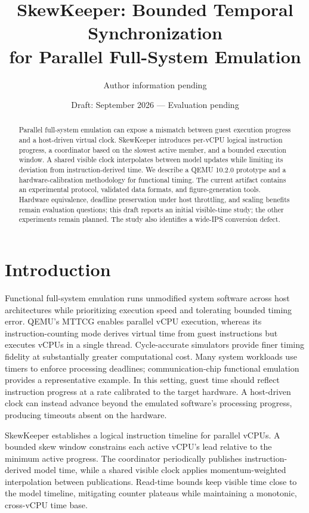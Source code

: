 \documentclass[10pt]{article}
\title{SkewKeeper: Bounded Temporal Synchronization\\for Parallel Full-System Emulation}
\author{Author information pending}
\date{Draft: September 2026 --- Evaluation pending}
\begin{document}
\maketitle
\begin{abstract}
Parallel full-system emulation can expose a mismatch between guest execution
progress and a host-driven virtual clock. SkewKeeper introduces per-vCPU logical
instruction progress, a coordinator based on the slowest active member, and a
bounded execution window. A shared visible clock interpolates between model
updates while limiting its deviation from instruction-derived time. We describe
a QEMU 10.2.0 prototype and a hardware-calibration methodology for functional
timing. The current artifact contains an experimental protocol, validated data
formats, and figure-generation tools. Hardware equivalence, deadline preservation
under host throttling, and scaling benefits remain evaluation questions; this
draft reports an initial visible-time study; the other experiments remain planned.
The study also identifies a wide-IPS conversion defect.
\end{abstract}

\section{Introduction}
Functional full-system emulation runs unmodified system software across host
architectures while prioritizing execution speed and tolerating bounded timing
error. QEMU's MTTCG enables parallel vCPU execution, whereas its
instruction-counting mode derives virtual time from guest instructions but
executes vCPUs in a single thread. Cycle-accurate simulators provide finer
timing fidelity at substantially greater computational cost. Many system
workloads use timers to enforce processing deadlines; communication-chip
functional emulation provides a representative example. In this setting,
guest time should reflect instruction progress at a rate calibrated to the
target hardware. A host-driven clock can instead advance beyond the emulated
software's processing progress, producing timeouts absent on the hardware.

SkewKeeper establishes a logical instruction timeline for parallel vCPUs.
A bounded skew window constrains each active vCPU's lead relative to the
minimum active progress. The coordinator periodically publishes
instruction-derived model time, while a shared visible clock applies
momentum-weighted interpolation between publications. Read-time bounds keep
visible time close to the model timeline, mitigating counter plateaus while
maintaining a monotonic, cross-vCPU time base.
\end{document}
